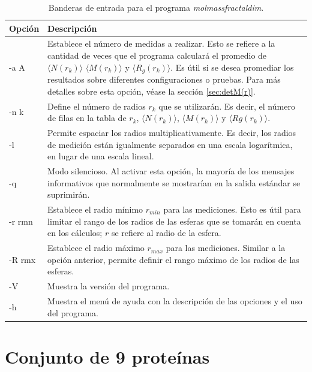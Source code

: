 	\begin{table}[H]
		\centering
		\begin{tabular}{lp{11cm}}
			\hline
			\textbf{Opci\'{o}n} & \textbf{Descripci\'{o}n} \\ \hline
			-a A & Establece el n\'{u}mero de medidas a realizar. Esto se refiere a la cantidad de veces que el programa calcular\'{a} el promedio de $\langle N(r_k) \rangle$ $\langle M(r_k) \rangle$ y $\langle R_g(r_k) \rangle$. Es \'{u}til si se desea promediar los resultados sobre diferentes configuraciones o pruebas. Para más detalles sobre esta opción, véase la sección \ref{sec:detM(r)}. 
			\\ 
			-n k & Define el n\'{u}mero de radios $r_{k}$ que se utilizar\'{a}n. Es decir, el n\'{u}mero de filas en la tabla de $r_{k}$, $\langle N(r_k) \rangle$, $\langle M(r_k) \rangle$ y $\langle Rg(r_k) \rangle$.
			\\
			-l & Permite espaciar los radios multiplicativamente. Es decir, los radios de medición están igualmente separados en una escala logarítmica, en lugar de una escala lineal.
			\\
			-q & Modo silencioso. Al activar esta opci\'{o}n, la mayor\'{i}a de los mensajes informativos que normalmente se mostrar\'{i}an en la salida est\'{a}ndar se suprimir\'{a}n. 
			\\ 
			-r rmn & Establece el radio m\'{i}nimo $r_{min}$ para las mediciones. Esto es \'{u}til para limitar el rango de los radios de las esferas que se tomar\'{a}n en cuenta en los c\'{a}lculos; $r$ se refiere al radio de la esfera. \\ 
			-R rmx & Establece el radio m\'{a}ximo $r_{max}$ para las mediciones. Similar a la opci\'{o}n anterior, permite definir el rango m\'{a}ximo de los radios de las esferas. 
			\\ 
			-V & Muestra la versi\'{o}n del programa. 
			\\ 
			-h & Muestra el men\'{u} de ayuda con la descripci\'{o}n de las opciones y el uso del programa. 
			\\ \hline
		\end{tabular}
		\caption{Banderas de entrada para el programa \emph{molmassfractaldim}.}
		\label{tab:opciones_programa}
	\end{table}
\color{black}

\chapter{Conjunto de 9 proteínas}

